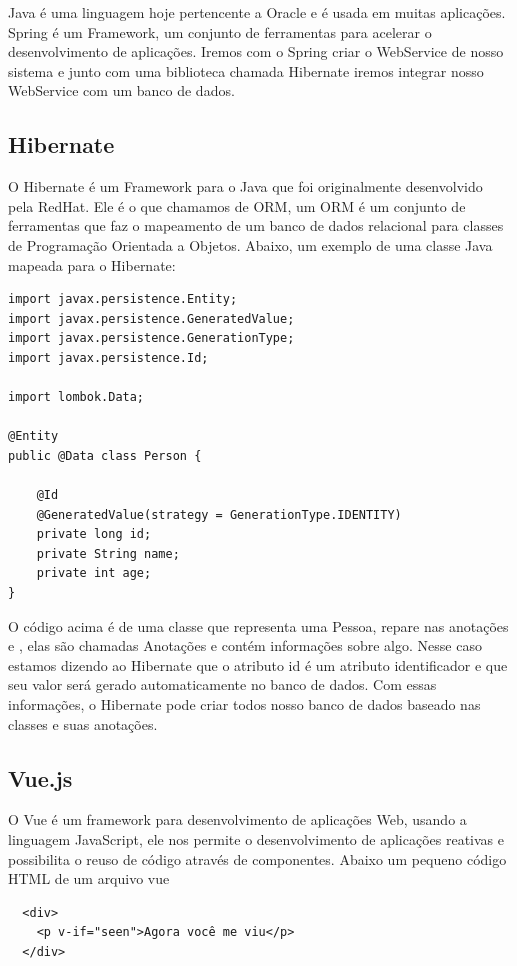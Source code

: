\documentclass[12pt]{article}
\begin{document}
Java é uma linguagem hoje pertencente a Oracle e é usada em muitas aplicações.
Spring é um Framework, um conjunto de ferramentas para acelerar o desenvolvimento de aplicações.
Iremos com o Spring criar o WebService de nosso sistema e junto com uma biblioteca chamada Hibernate
iremos integrar nosso WebService com um banco de dados.

\subsection{Hibernate}

O Hibernate é um Framework para o Java que foi originalmente desenvolvido pela RedHat.
Ele é o que chamamos de ORM, um ORM é um conjunto de ferramentas que faz o mapeamento
de um banco de dados relacional para classes de Programação Orientada a Objetos.
Abaixo, um exemplo de uma classe Java mapeada para o Hibernate:

\begin{verbatim}
import javax.persistence.Entity;
import javax.persistence.GeneratedValue;
import javax.persistence.GenerationType;
import javax.persistence.Id;

import lombok.Data;

@Entity
public @Data class Person {
    
    @Id
    @GeneratedValue(strategy = GenerationType.IDENTITY)
    private long id;
    private String name;
    private int age;
}
\end{verbatim}

O código acima é de uma classe que representa uma Pessoa, repare nas anotações
\@Id e \@GeneratedValue, elas são chamadas Anotações e contém informações sobre algo.
Nesse caso estamos dizendo ao Hibernate que o atributo id é um atributo identificador
e que seu valor será gerado automaticamente no banco de dados. Com essas informações, o
Hibernate pode criar todos nosso banco de dados baseado nas classes e suas anotações.

\subsection{Vue.js}

O Vue é um framework para desenvolvimento de aplicações Web, usando a linguagem JavaScript, 
ele nos permite o desenvolvimento de aplicações reativas e possibilita o reuso
de código através de componentes. Abaixo um pequeno código HTML de um arquivo vue

\begin{verbatim}
  <div>
    <p v-if="seen">Agora você me viu</p>
  </div>
\end{verbatim}
\end{document}
